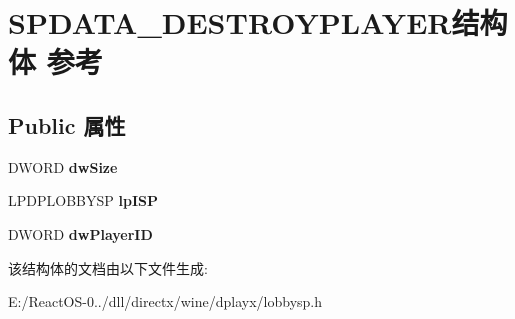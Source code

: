 \hypertarget{struct_s_p_d_a_t_a___d_e_s_t_r_o_y_p_l_a_y_e_r}{}\section{S\+P\+D\+A\+T\+A\+\_\+\+D\+E\+S\+T\+R\+O\+Y\+P\+L\+A\+Y\+E\+R结构体 参考}
\label{struct_s_p_d_a_t_a___d_e_s_t_r_o_y_p_l_a_y_e_r}
\subsection*{Public 属性}
\begin{DoxyCompactItemize}
\item 
\mbox{\label{struct_s_p_d_a_t_a___d_e_s_t_r_o_y_p_l_a_y_e_r_a02bf412e90e1cd10b2811d4f84f1fb36}} 
D\+W\+O\+RD {\bfseries dw\+Size}
\item 
\mbox{\label{struct_s_p_d_a_t_a___d_e_s_t_r_o_y_p_l_a_y_e_r_aa4809d4d68ec690c3e9927d67c3d86ad}} 
L\+P\+D\+P\+L\+O\+B\+B\+Y\+SP {\bfseries lp\+I\+SP}
\item 
\mbox{\label{struct_s_p_d_a_t_a___d_e_s_t_r_o_y_p_l_a_y_e_r_a6aa2cbfbd5344daf1d3a1c3b87878952}} 
D\+W\+O\+RD {\bfseries dw\+Player\+ID}
\end{DoxyCompactItemize}


该结构体的文档由以下文件生成\+:\begin{DoxyCompactItemize}
\item 
E\+:/\+React\+O\+S-\/0../dll/directx/wine/dplayx/lobbysp.\+h\end{DoxyCompactItemize}
